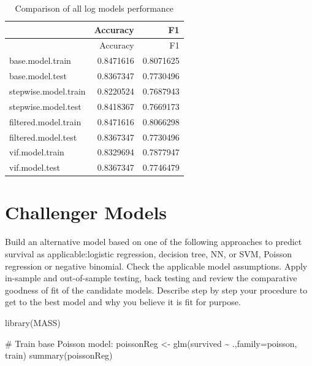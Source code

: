 \documentclass[
  letterpaper,
  DIV=11,
  numbers=noendperiod]{scrartcl}
\newenvironment{Shaded}{\begin{snugshade}}{\end{snugshade}}
\newcommand{\AttributeTok}[1]{\textcolor[rgb]{0.40,0.45,0.13}{#1}}
\newcommand{\CommentTok}[1]{\textcolor[rgb]{0.37,0.37,0.37}{#1}}
\newcommand{\FunctionTok}[1]{\textcolor[rgb]{0.28,0.35,0.67}{#1}}
\newcommand{\NormalTok}[1]{\textcolor[rgb]{0.00,0.23,0.31}{#1}}
\newcommand{\OtherTok}[1]{\textcolor[rgb]{0.00,0.23,0.31}{#1}}
\newcommand{\SpecialCharTok}[1]{\textcolor[rgb]{0.37,0.37,0.37}{#1}}
\begin{document}
\begin{longtable}[]{@{}lrr@{}}
\caption{Comparison of all log models performance}\tabularnewline
\toprule\noalign{}
& Accuracy & F1 \\
\midrule\noalign{}
\endfirsthead
\toprule\noalign{}
& Accuracy & F1 \\
\midrule\noalign{}
\endhead
\bottomrule\noalign{}
\endlastfoot
base.model.train & 0.8471616 & 0.8071625 \\
base.model.test & 0.8367347 & 0.7730496 \\
stepwise.model.train & 0.8220524 & 0.7687943 \\
stepwise.model.test & 0.8418367 & 0.7669173 \\
filtered.model.train & 0.8471616 & 0.8066298 \\
filtered.model.test & 0.8367347 & 0.7730496 \\
vif.model.train & 0.8329694 & 0.7877947 \\
vif.model.test & 0.8367347 & 0.7746479 \\
\end{longtable}

\section{Challenger Models}\label{challenger-models}

Build an alternative model based on one of the following approaches to
predict survival as applicable:logistic regression, decision tree, NN,
or SVM, Poisson regression or negative binomial. Check the applicable
model assumptions. Apply in-sample and out-of-sample testing, back
testing and review the comparative goodness of fit of the candidate
models. Describe step by step your procedure to get to the best model
and why you believe it is fit for purpose.

\begin{Shaded}
\begin{Highlighting}[]
\FunctionTok{library}\NormalTok{(MASS)}

\CommentTok{\# Train base Poisson model:}
\NormalTok{poissonReg }\OtherTok{\textless{}{-}} \FunctionTok{glm}\NormalTok{(survived }\SpecialCharTok{\textasciitilde{}}\NormalTok{ .,}\AttributeTok{family=}\NormalTok{poisson, train)}
\FunctionTok{summary}\NormalTok{(poissonReg)}
\end{Highlighting}
\end{Shaded}
\end{document}
